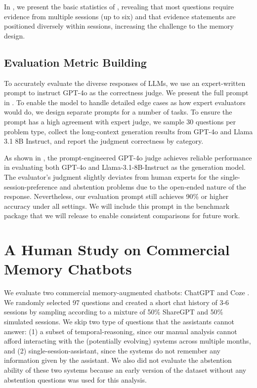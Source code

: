 {In , we present the basic statistics of \BENCHMARK, revealing that most questions require evidence from multiple sessions (up to six) and that evidence statements are positioned diversely within sessions, increasing the challenge to the memory design.}




\subsection{Evaluation Metric Building}
\label{appendix-evaluation–metric}

To accurately evaluate the diverse responses of LLMs, we use an expert-written prompt to instruct GPT-4o as the correctness judge. We present the full prompt in . To enable the model to handle detailed edge cases as how expert evaluators would do, we design separate prompts for a number of tasks. To ensure the prompt has a high agreement with expert judge, we sample 30 questions per problem type, collect the long-context generation results from GPT-4o and Llama 3.1 8B Instruct, and report the judgment correctness by category.

As shown in , the prompt-engineered GPT-4o judge achieves reliable performance in evaluating both GPT-4o and Llama-3.1-8B-Instruct as the generation model. The evaluator's judgment slightly deviates from human experts for the single-session-preference and abstention problems due to the open-ended nature of the response. Nevertheless, our evaluation prompt still achieves 90\% or higher accuracy under all settings. We will include this prompt in the benchmark package that we will release to enable consistent comparisons for future work.






\section{A Human Study on Commercial Memory Chatbots}
\label{appendix-manual-analysis}

We evaluate two commercial memory-augmented chatbots: ChatGPT \citep{openai_memory_2024} and Coze \citep{coze_memory_2024}. We randomly selected 97 questions and created a short chat history of 3-6 sessions by sampling according to a mixture of 50\% ShareGPT and 50\% simulated sessions. We skip two type of questions that the assistants cannot answer: (1) a subset of temporal-reasoning, since our manual analysis cannot afford interacting with the (potentially evolving) systems across multiple months, and (2) single-session-assistant, since the systems do not remember any information given by the assistant. We also did not evaluate the abstention ability of these two systems because an early version of the dataset without any abstention questions was used for this analysis. 

